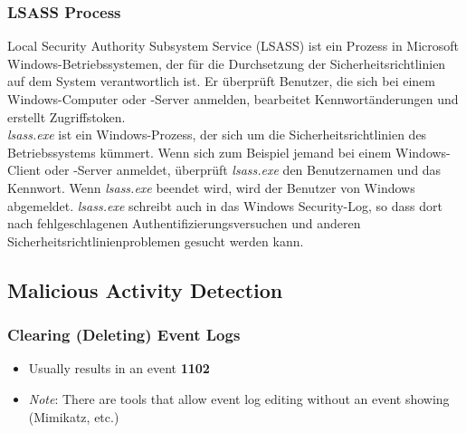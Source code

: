 \subsubsection{LSASS Process}
Local Security Authority Subsystem Service (LSASS) ist ein Prozess in Microsoft Windows-Betriebssystemen, der für die Durchsetzung der Sicherheitsrichtlinien auf dem System verantwortlich ist. 
Er überprüft Benutzer, die sich bei einem Windows-Computer oder -Server anmelden, bearbeitet Kennwortänderungen und erstellt Zugriffstoken.\\

\textit{lsass.exe} ist ein Windows-Prozess, der sich um die Sicherheitsrichtlinien des Betriebssystems kümmert. 
Wenn sich zum Beispiel jemand bei einem Windows-Client oder -Server anmeldet, überprüft \textit{lsass.exe} den Benutzernamen und das Kennwort. 
Wenn \textit{lsass.exe} beendet wird, wird der Benutzer von Windows abgemeldet.
\textit{lsass.exe} schreibt auch in das Windows Security-Log, so dass dort nach fehlgeschlagenen Authentifizierungsversuchen und anderen Sicherheitsrichtlinienproblemen gesucht werden kann.

\subsection{Malicious Activity Detection}

\subsubsection{Clearing (Deleting) Event Logs}
\begin{itemize}
    \item Usually results in an event \textbf{1102}
    \item \textit{Note}: There are tools that allow event log editing without an event showing (Mimikatz, etc.)
\end{itemize}

